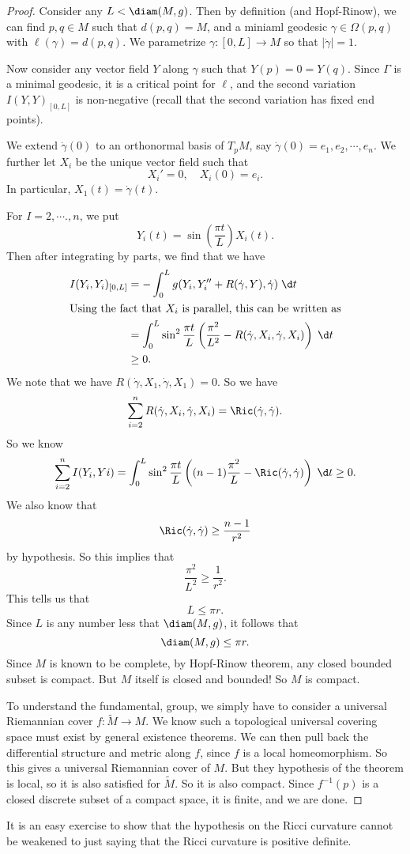 \documentclass[a4paper]{article}
\begin{document}
\begin{proof}
  Consider any $L < \diam (M, g)$. Then by definition (and Hopf-Rinow), we can find $p, q \in M$ such that $d(p, q) = M$, and a miniaml geodesic $\gamma \in \Omega(p, q)$ with $\ell(\gamma) = d(p, q)$. We parametrize $\gamma: [0, L] \to M$ so that $|\dot{\gamma}| = 1$.

  Now consider any vector field $Y$ along $\gamma$ such that $Y(p) = 0 = Y(q)$. Since $\Gamma$ is a minimal geodesic, it is a critical point for $\ell$, and the second variation $I(Y, Y)_{[0, L]}$ is non-negative (recall that the second variation has fixed end points).

  We extend $\dot{\gamma}(0)$ to an orthonormal basis of $T_p M$, say $\dot{\gamma}(0) = e_1, e_2, \cdots, e_n$. We further let $X_i$ be the unique vector field such that
  \[
    X_i' = 0,\quad X_i(0) = e_i.
  \]
  In particular, $X_1(t) = \dot{\gamma}(t)$.

  For $I = 2, \cdots., n$, we put
  \[
    Y_i(t) = \sin \left(\frac{\pi t}{L}\right) X_i(t).
  \]
  Then after integrating by parts, we find that we have
  \begin{align*}
    I(Y_i, Y_i)_{[0,L]} &= - \int_0^L g(Y_i, Y_i'' + R(\dot{\gamma}, Y), \dot{\gamma}) \;\d t\\
    \intertext{Using the fact that $X_i$ is parallel, this can be written as}
    &= \int_0^L \sin^2 \frac{\pi t}{L} \left(\frac{\pi^2}{L^2} - R(\dot{\gamma}, X_i, \dot{\gamma}, X_i)\right)\;\d t\\
    &\geq 0.
  \end{align*}
  We note that we have $R(\dot{\gamma}, X_1, \dot{\gamma}, X_1) = 0$. So we have
  \[
    \sum_{i = 2}^n R(\dot{\gamma}, X_i, \dot{\gamma}, X_i) = \Ric(\dot{\gamma}, \dot{\gamma}).
  \]
  So we know
  \[
    \sum_{i = 2}^n I(Y_i, Yi) = \int_0^L \sin^2 \frac{\pi t}{L}\left((n - 1) \frac{\pi^2}{L} - \Ric(\dot{\gamma}, \dot{\gamma})\right)\;\d t \geq 0.
  \]
  We also know that
  \[
    \Ric(\dot{\gamma}, \dot{\gamma}) \geq \frac{n - 1}{r^2}
  \]
  by hypothesis. So this implies that
  \[
    \frac{\pi^2}{L^2} \geq \frac{1}{r^2}.
  \]
  This tells us that
  \[
    L \leq \pi r.
  \]
  Since $L$ is any number less that $\diam(M, g)$, it follows that
  \[
    \diam(M, g) \leq \pi r.
  \]
  Since $M$ is known to be complete, by Hopf-Rinow theorem, any closed bounded subset is compact. But $M$ itself is closed and bounded! So $M$ is compact.

  To understand the fundamental, group, we simply have to consider a universal Riemannian cover $f: \tilde{M} \to M$. We know such a topological universal covering space must exist by general existence theorems. We can then pull back the differential structure and metric along $f$, since $f$ is a local homeomorphism. So this gives a universal Riemannian cover of $M$. But they hypothesis of the theorem is local, so it is also satisfied for $\tilde{M}$. So it is also compact. Since $f^{-1}(p)$ is a closed discrete subset of a compact space, it is finite, and we are done.
\end{proof}
It is an easy exercise to show that the hypothesis on the Ricci curvature cannot be weakened to just saying that the Ricci curvature is positive definite.
\end{document}
